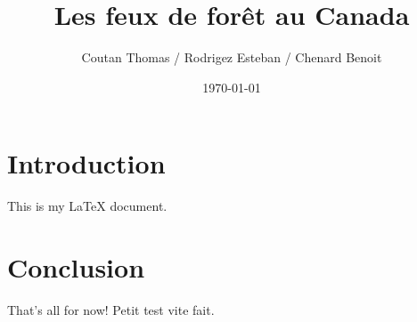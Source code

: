 \documentclass{article}
\begin{document}
\title{Les feux de forêt au Canada}
\author{Coutan Thomas / Rodrigez Esteban / Chenard Benoit}
\date{\today}
\maketitle

\section{Introduction}

This is my LaTeX document.

\section{Conclusion}

That's all for now! Petit test vite fait.
\end{document}
